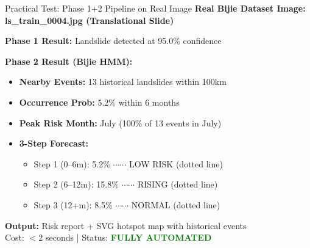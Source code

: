 \documentclass[aspectratio=169]{beamer}
\begin{document}
\begin{frame}[fragile]{Practical Test: Phase 1+2 Pipeline on Real Image}
    \textbf{Real Bijie Dataset Image: ls\_train\_0004.jpg (Translational Slide)}
    
    \vspace{0.2cm}
    \textbf{Phase 1 Result:} Landslide detected at 95.0\% confidence \checkmark
    \vspace{0.2cm}

    \textbf{Phase 2 Result (Bijie HMM):}
    \begin{itemize}
        \item \textbf{Nearby Events:} 13 historical landslides within 100km
        \item \textbf{Occurrence Prob:} 5.2\% within 6 months
        \item \textbf{Peak Risk Month:} July (100\% of 13 events in July)
        \item \textbf{3-Step Forecast:}
        \begin{itemize}
            \item Step 1 (0--6m): 5.2\% $\cdots\cdots$ LOW RISK (dotted line)
            \item Step 2 (6--12m): 15.8\% $\cdots\cdots$ RISING (dotted line)
            \item Step 3 (12+m): 8.5\% $\cdots\cdots$ NORMAL (dotted line)
        \end{itemize}
    \end{itemize}

    \vspace{0.2cm}
    \textbf{Output:} Risk report + SVG hotspot map with historical events\\Cost: $<2$ seconds | Status: \textcolor{green}{\textbf{FULLY AUTOMATED}}
\end{frame}
\end{document}
